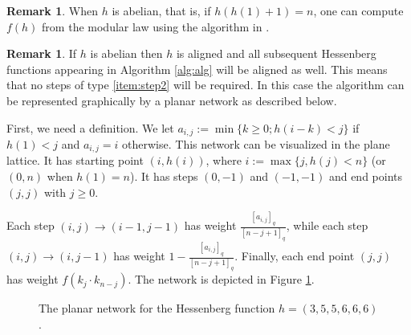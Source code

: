\documentclass[10pt]{amsart}
\theoremstyle{definition}
\newtheorem{Rem}[Lem]{Remark}
\newcommand{\dyckpath}[2]{
\draw[line width=2pt] (#1) foreach \dir in {#2}{ -- ++(\dir*90:1)};
}
\newcommand{\gline}[4]{
\draw[line width=#4 pt, color=#3] (#1) -- (#2);
}
\newcommand{\glinear}[4]{
\draw[line width=#3 pt, color=#2,postaction=decorate] (#1) -- +(0,-1);
\node at ($(#1)+(-0,-0.5)$) { #4};
}
\newcommand{\glinearr}[4]{
\draw[line width=#3 pt, color=#2,postaction=decorate] (#1) -- +(-1,-1);
\node at ($(#1)+(-0.5,-0.5)$) { #4};
}
\begin{document}
\begin{Rem}
When $h$ is abelian, that is, if $h(h(1)+1)=n$, one can compute $f(h)$ from the modular law using the algorithm in \cite[Proposition 29]{Alexandersson_2020}.\par
\end{Rem}
\begin{Rem}
\label{rem:network}
If $h$ is abelian then $h$ is aligned and all subsequent Hessenberg functions appearing in Algorithm \ref{alg:alg} will be aligned as well. This means that no steps of type \eqref{item:step2} will be required. In this case the algorithm can be represented graphically by a planar network as described below. \par
  First, we need a definition. We let $a_{i,j}:=\min\{k\geq 0; h(i-k)<j\}$ if $h(1)<j$ and $a_{i,j}=i$ otherwise. This network can be visualized in the plane lattice. It has starting point $(i,h(i))$, where $i:=\max\{j,h(j)<n\}$ (or $(0,n)$ when $h(1)=n$). It has steps $(0,-1)$ and $(-1,-1)$ and end points $(j,j)$ with $j\geq0$.\par
   Each step $(i,j)\to (i-1,j-1)$ has weight $\frac{[a_{i,j}]_q}{[n-j+1]_q}$, while each step $(i,j)\to (i,j-1)$ has weight $1-\frac{[a_{i,j}]_q}{[n-j+1]_q}$. Finally, each end point $(j,j)$ has weight $f(k_j\cdot k_{n-j})$. The network is depicted in Figure \ref{fig:network}.
\begin{figure}[htb]  \centering
{}
\caption{The planar network for the Hessenberg function $h=(3,5,5,6,6,6)$.}
\label{fig:network}
\end{figure}
\end{Rem}
\end{document}
